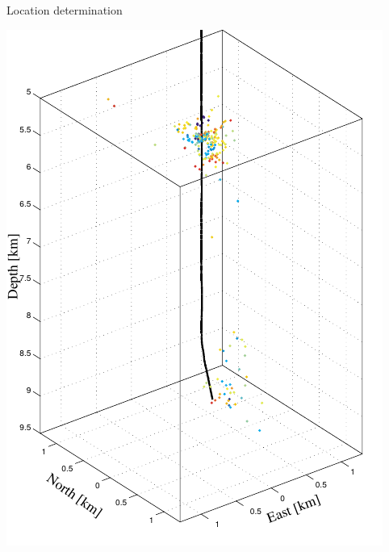 \documentclass[14pt]{beamer}
\begin{document}
\begin{frame}{Location determination}
  \begin{center}
    \includegraphics[scale=0.7]{img/KTB2000_hypocenters_3D.pdf}
  \end{center}
\end{frame}
\end{document}
